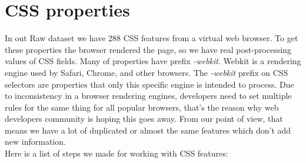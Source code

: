 \section{CSS properties}
\label{sec:css}
In out Raw dataset we have 288 CSS features from a virtual web browser. To get these properties the browser rendered the page, so we have real post-processing values of CSS fields. Many of properties have prefix \textit{-webkit}. Webkit is a rendering engine used by Safari, Chrome, and other browsers. The \textit{-webkit} prefix on CSS selectors are properties that only this specific engine is intended to process. Due to inconsistency in a browser rendering engines, developers need to set multiple rules for the same thing for all popular browsers, that's the reason why web developers community is hoping this goes away. From our point of view, that means we have a lot of duplicated or almost the same features which don't add new information.\\

Here is a list of steps we made for working with CSS features:

